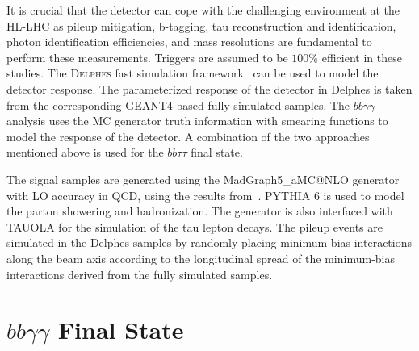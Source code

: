 It is crucial that the \phasetwo detector can cope with the challenging environment at the HL-LHC as pileup mitigation, b-tagging, tau reconstruction and identification, photon identification efficiencies, and mass  resolutions are fundamental to perform these measurements. Triggers are assumed to be $100\%$ efficient in these studies. The \textsc{Delphes} fast simulation framework~\cite{deFavereau:2013fsa} can be used to model the \phasetwo detector response. The parameterized response of the \phasetwo detector in Delphes is taken from the corresponding GEANT4 based fully simulated samples. The $bb\gamma\gamma$ analysis uses the MC generator truth information with smearing functions to model the response of the detector. A combination of the two approaches mentioned above is used for the $bb\tau\tau$ final state.  

The signal samples are generated using the MadGraph5\_aMC@NLO generator with LO accuracy in QCD, using the results from~\cite{Frederix2014142}. PYTHIA 6 is used to model the parton showering and hadronization. The generator is also interfaced with TAUOLA for the simulation of the tau lepton decays. The pileup events are simulated in the Delphes samples by randomly placing minimum-bias interactions along the beam axis according to the longitudinal spread of the minimum-bias interactions derived from the fully simulated samples.

\section{$bb\gamma\gamma$ Final State}

